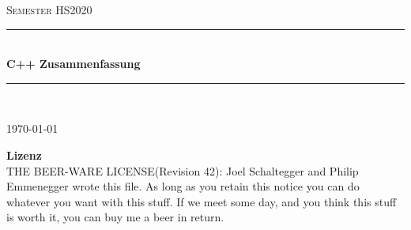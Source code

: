 
\newcommand{\TITLE}{C++ Zusammenfassung}
\newcommand{\SUBJECT}{Semester HS2020}

\begin{titlepage}

\vspace*{\fill}

\newcommand{\HRule}{\color{black}\rule{\linewidth}{0.5mm}} %

\begin{center}

\vspace{0.5cm}

\textsc{\huge \SUBJECT}\\[1cm]

{\HRule} \\[0.7cm]
{ \Huge \bfseries \textcolor{OSTPink} {\TITLE}}\\[0.4cm]
{\HRule} \\[1.1cm]

\Large \AUTHOR

\Large \today


\end{center}

\vspace{10cm}

\textbf{Lizenz}\\
\dq THE BEER-WARE LICENSE\dq (Revision 42): Joel Schaltegger and Philip Emmenegger wrote this file. As long as you retain this notice you can do whatever you want with this stuff. If we meet some day, and you think this stuff is worth it, you can buy me a beer in return.



\vfill %

\end{titlepage}


\tableofcontents
